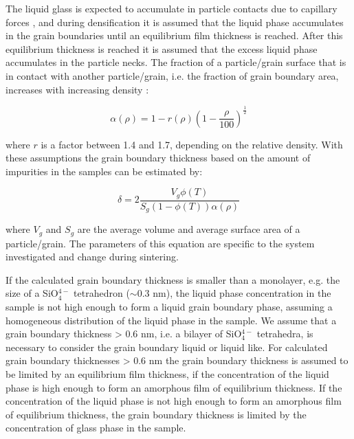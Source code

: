 The liquid glass is expected to accumulate in particle contacts due to capillary forces \cite{Shaw1986}, and during densification it is assumed that the liquid phase accumulates in the grain boundaries until an equilibrium film thickness \cite{Subramaniam2006} is reached. After this equilibrium thickness is reached it is assumed that the excess liquid phase accumulates in the particle necks. The fraction of a particle/grain surface that is in contact with another particle/grain, i.e. the fraction of grain boundary area, increases with increasing density \cite{German2016}:

\begin{equation}
\label{Ch4-eq: eq1}
\alpha(\rho) = 1 - r(\rho) \left(1-\frac{\rho}{100} \right)^{\frac{1}{2}}
\end{equation}

\noindent where $r$ is a factor between 1.4 and 1.7, depending on the relative density. With these assumptions the grain boundary thickness based on the amount of impurities in the samples can be estimated by:

\begin{equation}
\label{Ch4-eq: eq2}
\delta = 2 \frac{V_{g}\phi (T)}{S_{g}\left(1-\phi(T)\right)\alpha(\rho)}
\end{equation}

\noindent where $V_{g}$ and $S_{g}$ are the average volume and average surface area of a particle/grain. The parameters of this equation are specific to the system investigated and change during sintering.

If the calculated grain boundary thickness is smaller than a monolayer, e.g. the size of a SiO$_{4}^{4-}$ tetrahedron ($\sim$0.3 nm), the liquid phase concentration in the sample is not high enough to form a liquid grain boundary phase, assuming a homogeneous distribution of the liquid phase in the sample. We assume that a grain boundary thickness > 0.6 nm, i.e. a bilayer of SiO$_{4}^{4-}$ tetrahedra, is necessary to consider the grain boundary liquid or liquid like. For calculated grain boundary thicknesses > 0.6 nm the grain boundary thickness is assumed to be limited by an equilibrium film thickness, if the concentration of the liquid phase is high enough to form an amorphous film of equilibrium thickness. If the concentration of the liquid phase is not high enough to form an amorphous film of equilibrium thickness, the grain boundary thickness is limited by the concentration of glass phase in the sample.

